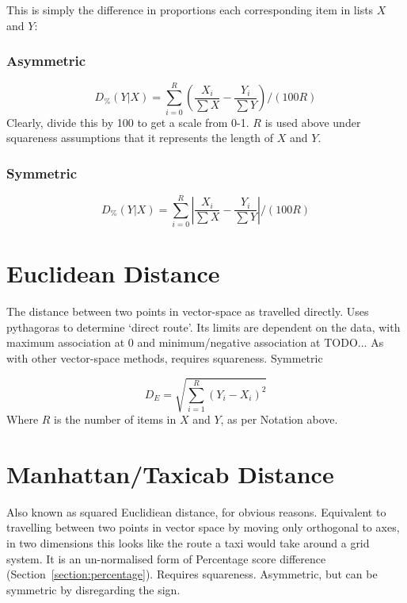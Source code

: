 \documentclass[11pt]{article}
\begin{document}
This is simply the difference in proportions each corresponding item in lists $X$ and $Y$:

\subsubsection{Asymmetric}
$$
D_\%(Y|X) = { \sum_{i=0}^{R}{ \left(  \frac{X_i}{\sum{X}} - \frac{Y_i}{\sum{Y}} \right) }  \bigg / (100R) }
$$
Clearly, divide this by 100 to get a scale from 0-1.  $R$ is used above under squareness assumptions that it represents the length of $X$ and $Y$.

\subsubsection{Symmetric}
$$
D_\%(Y|X) = { \sum_{i=0}^{R}{ \left|  \frac{X_i}{\sum{X}} - \frac{Y_i}{\sum{Y}} \right| }  \bigg / (100R) }
$$














\section{Euclidean Distance}
\label{section:euclid}
The distance between two points in vector-space as travelled directly.  Uses pythagoras to determine `direct route'.  Its limits are dependent on the data, with maximum association at 0 and minimum/negative association at TODO...  As with other vector-space methods, requires squareness.  Symmetric

$$
D_E = \sqrt{ \sum_{i=1}^{R}{ (Y_i - X_i)^2 } }
$$
Where $R$ is the number of items in $X$ and $Y$, as per Notation above.













\section{Manhattan/Taxicab Distance}
\label{section:manhattan}
Also known as squared Euclidiean distance, for obvious reasons.  Equivalent to travelling between two points in vector space by moving only orthogonal to axes, in two dimensions this looks like the route a taxi would take around a grid system.  It is an un-normalised form of Percentage score difference (Section~\ref{section:percentage}).  Requires squareness.  Asymmetric, but can be symmetric by disregarding the sign.
 
\end{document}
